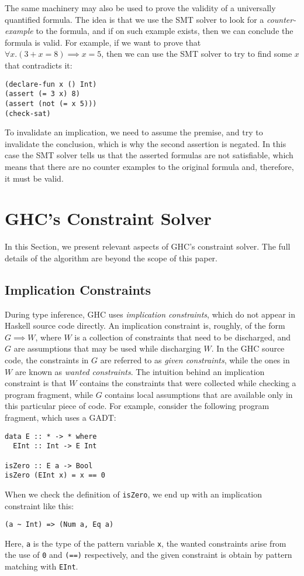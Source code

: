 \documentclass{sigplanconf}
\begin{document}
The same machinery may also be used to prove the validity of
a universally quantified formula. The idea is that we use the SMT solver
to look for a {\em counter-example} to the formula, and if on such
example exists, then we can conclude the formula is valid.
For example, if we want to prove that $\forall x. (3 + x = 8) \implies x = 5$,
then we can use the SMT solver to try to find some $x$ that contradicts it:

\begin{Verbatim}
(declare-fun x () Int)
(assert (= 3 x) 8)
(assert (not (= x 5)))
(check-sat)
\end{Verbatim}

To invalidate an implication, we need to assume the premise, and try to
invalidate the conclusion, which is why the second assertion is negated.
In this case the SMT solver tells us that the asserted formulas are not
satisfiable, which means that there are no counter examples to the original
formula and, therefore, it must be valid.


\section{GHC's Constraint Solver}

In this Section, we present relevant aspects of GHC's constraint solver.
The full details of the algorithm \cite{outsidein} are beyond the scope
of this paper.

\subsection{Implication Constraints}
During type inference, GHC uses {\em implication constraints}, which do
not appear in Haskell source code directly. An implication constraint is,
roughly, of the form $G\implies W$, where $W$ is a collection
of constraints that need to be discharged, and $G$ are assumptions that
may be used while discharging $W$.  In the GHC source code, the constraints
in $G$ are referred to as {\em given constraints}, while the ones in $W$ are
known as {\em wanted constraints}.  The intuition behind an implication
constraint is that $W$ contains the constraints that were collected
while checking a program fragment, while $G$ contains local assumptions
that are available only in this particular piece of code.  For example,
consider the following program fragment, which uses a GADT:
\begin{Verbatim}
data E :: * -> * where
  EInt :: Int -> E Int

isZero :: E a -> Bool
isZero (EInt x) = x == 0
\end{Verbatim}
When we check the definition of \verb"isZero", we end up with an implication
constraint like this:
\begin{Verbatim}
(a ~ Int) => (Num a, Eq a)
\end{Verbatim}
Here, \verb"a" is the type of the pattern variable \verb"x", the wanted
constraints arise from the use of \verb"0" and \verb"(==)" respectively,
and the given constraint is obtain by pattern matching with \verb"EInt".
\end{document}
